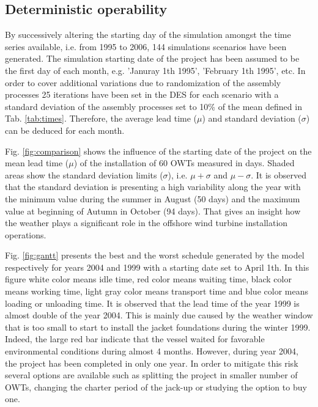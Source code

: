 \subsection{Deterministic operability}
By successively altering the starting day of the simulation amongst the time series available, i.e. from 1995 to 2006, 144 simulations scenarios have been generated. The simulation starting date of the project has been assumed to be the first day of each month, e.g. 'Januray 1th 1995', 'February 1th 1995', etc. In order to cover additional variations due to randomization of the assembly processes 25 iterations have been set in the DES for each scenario with a standard deviation of the assembly processes set to 10\% of the mean defined in Tab. \ref{tab:times}. Therefore, the average lead time ($\mu$) and standard deviation ($\sigma$) can be deduced for each month.

Fig. \ref{fig:comparison} shows the influence of the starting date of the project on the mean lead time ($\mu$) of the installation of 60 OWTs measured in days. Shaded areas show the standard deviation limits ($\sigma$), i.e. $\mu + \sigma$ and $\mu - \sigma$. It is observed that the standard deviation is presenting a high variability along the year with the minimum value during the summer in August (50 days) and the maximum value at beginning of Autumn in October (94 days). That gives an insight how the weather plays a significant role in the offshore wind turbine installation operations.

Fig. \ref{fig:gantt} presents the best and the worst schedule generated by the model respectively for years 2004 and 1999 with a starting date set to April 1th. In this figure white color means idle time, red color means waiting time, black color means working time, light gray color means transport time and blue color means loading or unloading time. It is observed that the lead time of the year 1999 is almost double of the year 2004. This is mainly due caused by the weather window that is too small to start to install the jacket foundations during the winter 1999. Indeed, the large red bar indicate that the vessel waited for favorable environmental conditions during almost 4 months. However, during year 2004, the project has been completed in only one year. In order to mitigate this risk several options are available such as splitting the project in smaller number of OWTs, changing the charter period of the jack-up or studying the option to buy one.

